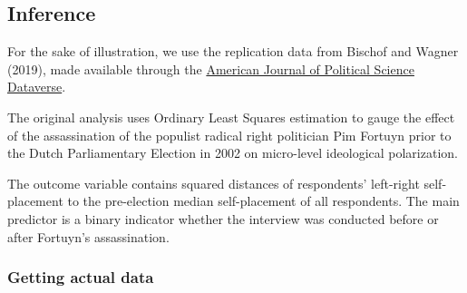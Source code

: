 \documentclass[
  11pt,
]{article}
\begin{document}
\hypertarget{inference}{%
\subsection{Inference}\label{inference}}

For the sake of illustration, we use the replication data from Bischof and Wagner (2019), made available through the \href{https://doi.org/10.7910/DVN/DZ1NFG}{American Journal of Political Science Dataverse}.

The original analysis uses Ordinary Least Squares estimation to gauge the effect of the assassination of the populist radical right politician Pim Fortuyn prior to the Dutch Parliamentary Election in 2002 on micro-level ideological polarization.

The outcome variable contains squared distances of respondents' left-right self-placement to the pre-election median self-placement of all respondents. The main predictor is a binary indicator whether the interview was conducted before or after Fortuyn's assassination.

\hypertarget{getting-actual-data}{%
\subsubsection{Getting actual data}\label{getting-actual-data}}
\end{document}
